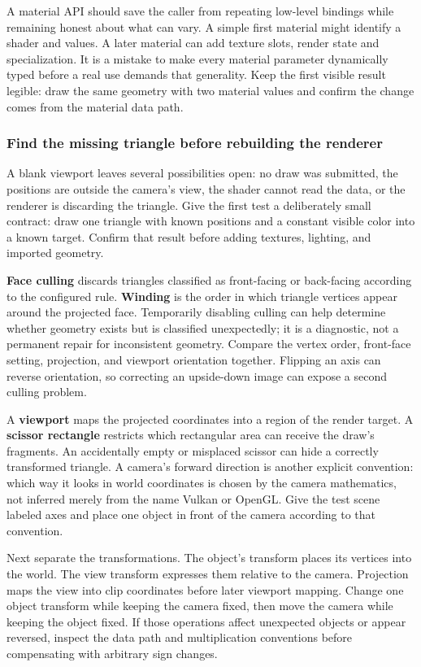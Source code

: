 A material API should save the caller from repeating low-level bindings while remaining honest about what can vary. A simple first material might identify a shader and values. A later material can add texture slots, render state and specialization. It is a mistake to make every material parameter dynamically typed before a real use demands that generality. Keep the first visible result legible: draw the same geometry with two material values and confirm the change comes from the material data path.

\subsubsection{Find the missing triangle before rebuilding the renderer}\label{06-engine-ii-ch026-find-the-missing-triangle-before-rebuilding-the-renderer}

A blank viewport leaves several possibilities open: no draw was submitted, the positions are outside the camera's view, the shader cannot read the data, or the renderer is discarding the triangle. Give the first test a deliberately small contract: draw one triangle with known positions and a constant visible color into a known target. Confirm that result before adding textures, lighting, and imported geometry.

\textbf{Face culling} discards triangles classified as front-facing or back-facing according to the configured rule. \textbf{Winding} is the order in which triangle vertices appear around the projected face. Temporarily disabling culling can help determine whether geometry exists but is classified unexpectedly; it is a diagnostic, not a permanent repair for inconsistent geometry. Compare the vertex order, front-face setting, projection, and viewport orientation together. Flipping an axis can reverse orientation, so correcting an upside-down image can expose a second culling problem.

A \textbf{viewport} maps the projected coordinates into a region of the render target. A \textbf{scissor rectangle} restricts which rectangular area can receive the draw's fragments. An accidentally empty or misplaced scissor can hide a correctly transformed triangle. A camera's forward direction is another explicit convention: which way it looks in world coordinates is chosen by the camera mathematics, not inferred merely from the name Vulkan or OpenGL. Give the test scene labeled axes and place one object in front of the camera according to that convention.

Next separate the transformations. The object's transform places its vertices into the world. The view transform expresses them relative to the camera. Projection maps the view into clip coordinates before later viewport mapping. Change one object transform while keeping the camera fixed, then move the camera while keeping the object fixed. If those operations affect unexpected objects or appear reversed, inspect the data path and multiplication conventions before compensating with arbitrary sign changes.

